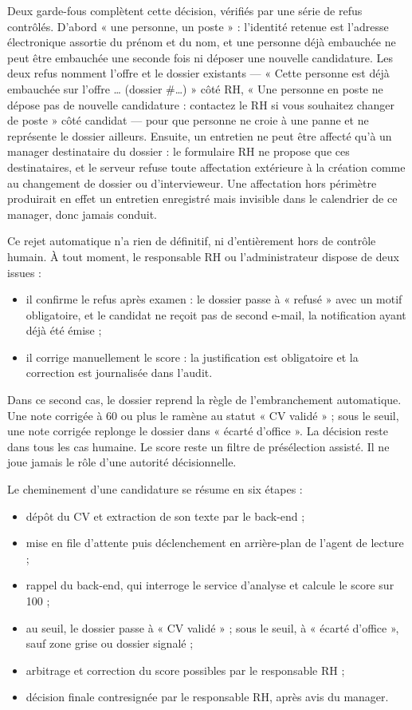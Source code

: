 \documentclass[]{./tpl/isipfe}
\begin{document}
Deux garde-fous complètent cette décision, vérifiés par une série de refus contrôlés. D’abord « une personne, un poste » : l’identité retenue est l’adresse électronique assortie du prénom et du nom, et une personne déjà embauchée ne peut être embauchée une seconde fois ni déposer une nouvelle candidature. Les deux refus nomment l’offre et le dossier existants — « Cette personne est déjà embauchée sur l’offre … (dossier \#…) » côté RH, « Une personne en poste ne dépose pas de nouvelle candidature : contactez le RH si vous souhaitez changer de poste » côté candidat — pour que personne ne croie à une panne et ne représente le dossier ailleurs. Ensuite, un entretien ne peut être affecté qu’à un manager destinataire du dossier : le formulaire RH ne propose que ces destinataires, et le serveur refuse toute affectation extérieure à la création comme au changement de dossier ou d’intervieweur. Une affectation hors périmètre produirait en effet un entretien enregistré mais invisible dans le calendrier de ce manager, donc jamais conduit.

Ce rejet automatique n’a rien de définitif, ni d’entièrement hors de contrôle humain. À tout moment, le responsable RH ou l’administrateur dispose de deux issues :

\begin{itemize}
\item il confirme le refus après examen : le dossier passe à « refusé » avec un motif obligatoire, et le candidat ne reçoit pas de second e-mail, la notification ayant déjà été émise ;
\item il corrige manuellement le score : la justification est obligatoire et la correction est journalisée dans l’audit.
\end{itemize}

Dans ce second cas, le dossier reprend la règle de l’embranchement automatique. Une note corrigée à 60 ou plus le ramène au statut « CV validé » ; sous le seuil, une note corrigée replonge le dossier dans « écarté d’office ». La décision reste dans tous les cas humaine. Le score reste un filtre de présélection assisté. Il ne joue jamais le rôle d’une autorité décisionnelle.

Le cheminement d’une candidature se résume en six étapes :
\begin{itemize}
\item dépôt du CV et extraction de son texte par le back-end ;
\item mise en file d’attente puis déclenchement en arrière-plan de l’agent de lecture ;
\item rappel du back-end, qui interroge le service d’analyse et calcule le score sur 100 ;
\item au seuil, le dossier passe à « CV validé » ; sous le seuil, à « écarté d’office », sauf zone grise ou dossier signalé ;
\item arbitrage et correction du score possibles par le responsable RH ;
\item décision finale contresignée par le responsable RH, après avis du manager.
\end{itemize}
\end{document}
